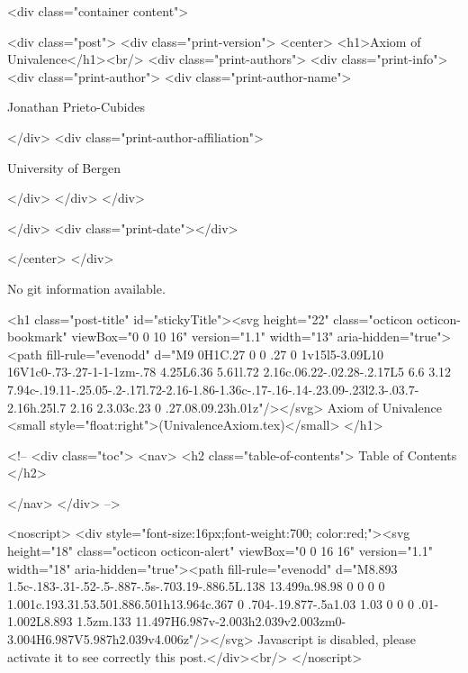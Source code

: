      <div class="container content">
        







<div class="post">
  <div class="print-version">
    <center>
      <h1>Axiom of Univalence</h1><br/>
        <div class="print-authors">
          <div class="print-info">
            <div class="print-author">
              <div class="print-author-name">
                
                  Jonathan Prieto-Cubides
                
              </div>
              <div class="print-author-affiliation">
                
                  University of Bergen
                
                </div>
            </div>
          </div>
          
          
        </div>
        <div class="print-date"></div>
        
        
    </center>
  </div>

  
  No git information available.
  

  <h1 class="post-title" id="stickyTitle"><svg height="22" class="octicon octicon-bookmark" viewBox="0 0 10 16" version="1.1" width="13" aria-hidden="true"><path fill-rule="evenodd" d="M9 0H1C.27 0 0 .27 0 1v15l5-3.09L10 16V1c0-.73-.27-1-1-1zm-.78 4.25L6.36 5.61l.72 2.16c.06.22-.02.28-.2.17L5 6.6 3.12 7.94c-.19.11-.25.05-.2-.17l.72-2.16-1.86-1.36c-.17-.16-.14-.23.09-.23l2.3-.03.7-2.16h.25l.7 2.16 2.3.03c.23 0 .27.08.09.23h.01z"/></svg> Axiom of Univalence <small style="float:right">(UnivalenceAxiom.tex)</small>
  </h1>

  <!-- 
  <div class="toc">
    <nav>
    <h2 class="table-of-contents"> Table of Contents </h2>
      

    </nav>
  </div>
   -->

  <noscript>
  <div style="font-size:16px;font-weight:700; color:red;"><svg height="18" class="octicon octicon-alert" viewBox="0 0 16 16" version="1.1" width="18" aria-hidden="true"><path fill-rule="evenodd" d="M8.893 1.5c-.183-.31-.52-.5-.887-.5s-.703.19-.886.5L.138 13.499a.98.98 0 0 0 0 1.001c.193.31.53.501.886.501h13.964c.367 0 .704-.19.877-.5a1.03 1.03 0 0 0 .01-1.002L8.893 1.5zm.133 11.497H6.987v-2.003h2.039v2.003zm0-3.004H6.987V5.987h2.039v4.006z"/></svg> Javascript is disabled, please activate it to see correctly this post.</div><br/>
  </noscript>

